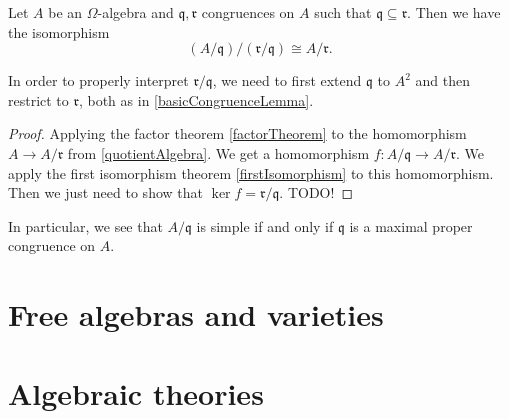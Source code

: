 \begin{theorem}
Let $A$ be an $\Omega$-algebra and $\mathfrak{q},\mathfrak{r}$ congruences on $A$ such that $\mathfrak{q} \subseteq \mathfrak{r}$. Then we have the isomorphism
\[ (A/\mathfrak{q})/(\mathfrak{r}/\mathfrak{q}) \cong A/\mathfrak{r}. \]
\end{theorem}
In order to properly interpret $\mathfrak{r}/\mathfrak{q}$, we need to first extend $\mathfrak{q}$ to $A^2$ and then restrict to $\mathfrak{r}$, both as in \ref{basicCongruenceLemma}.
\begin{proof}
Applying the factor theorem \ref{factorTheorem} to the homomorphism $A\to A/\mathfrak{r}$ from \ref{quotientAlgebra}. We get a homomorphism $f: A/\mathfrak{q} \to A/\mathfrak{r}$. We apply the first isomorphism theorem \ref{firstIsomorphism} to this homomorphism. Then we just need to show that $\ker f = \mathfrak{r}/\mathfrak{q}$. TODO!
\end{proof}
In particular, we see that $A/\mathfrak{q}$ is simple if and only if $\mathfrak{q}$ is a maximal proper congruence on $A$.

\section{Free algebras and varieties}

\section{Algebraic theories}
